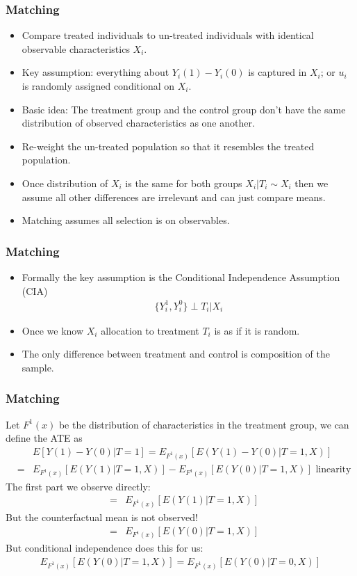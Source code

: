 \documentclass[xcolor=pdftex,dvipsnames,table,mathserif]{beamer}
\begin{document}
\begin{frame}
\frametitle{Matching}
\begin{itemize}
\item Compare treated individuals to un-treated individuals with identical observable characteristics $X_i$.
\item Key assumption: everything about $Y_i(1) - Y_i(0)$ is captured in $X_i$; or $u_i$ is randomly assigned conditional on $X_i$.
\item Basic idea: The treatment group and the control group don't have the same distribution of observed characteristics as one another. 
\item \alert{Re-weight} the un-treated population so that it resembles the treated population.
\item Once distribution of $X_i$ is the same for both groups $ X_i | T_i \sim X_i$ then we assume all other differences are irrelevant and can just compare means.
\item Matching assumes \alert{all selection is on observables}.
\end{itemize}
\end{frame}

\begin{frame}
\frametitle{Matching}
\begin{itemize}
\item Formally the key assumption is the \alert{Conditional Independence Assumption (CIA)}
\begin{eqnarray*}
\{Y_i^1,Y_i^0\}  \perp T_i | X_i
\end{eqnarray*}
\item Once we know $X_i$ allocation to treatment $T_i$ is as if it is random.
\item The only difference between treatment and control is composition of the sample.
\end{itemize}
\end{frame}


\begin{frame}
\frametitle{Matching}
Let  $F^{1}(x)$ be the distribution of characteristics in the treatment group, we can define the ATE as 
\begin{eqnarray*}
&&E[Y(1) - Y(0) | T =1] = E_{F^1(x)} [E(Y(1) -Y(0) | T=1,X)] \\
&=&  E_{F^1(x)} [E(Y(1) | T=1,X)] -  E_{F^1(x)} [E(Y(0) | T=1,X)] \mbox{ linearity } 
\end{eqnarray*}
The first part we observe directly:
\begin{eqnarray*}
&=&  E_{F^1(x)} [E(Y(1) | T=1,X)] 
\end{eqnarray*}
But the counterfactual mean is not observed!
\begin{eqnarray*}
&=&  E_{F^1(x)} [E(Y(0) | T=1,X)] 
\end{eqnarray*}
But conditional independence does this for us:
\begin{eqnarray*}
 E_{F^1(x)} [E(Y(0) | T=1,X)]  =  E_{F^1(x)} [E(Y(0) | T=0,X)] 
\end{eqnarray*}
\end{frame}
\end{document}
